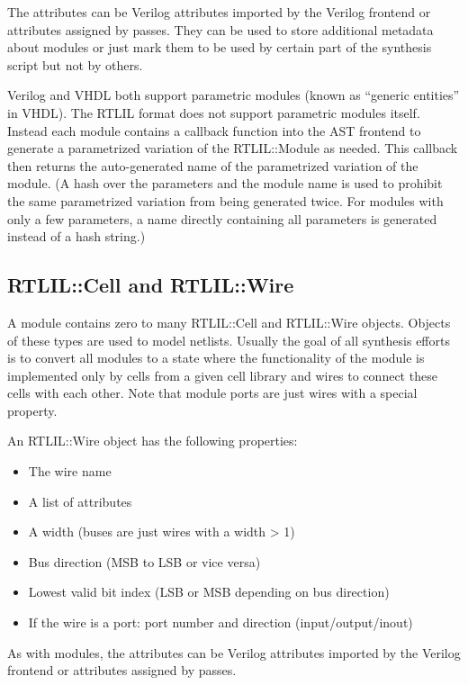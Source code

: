 The attributes can be Verilog attributes imported by the Verilog frontend or attributes assigned
by passes. They can be used to store additional metadata about modules or just mark them to be
used by certain part of the synthesis script but not by others.

Verilog and VHDL both support parametric modules (known as ``generic entities'' in VHDL). The RTLIL
format does not support parametric modules itself. Instead each module contains a callback function
into the AST frontend to generate a parametrized variation of the RTLIL::Module as needed. This
callback then returns the auto-generated name of the parametrized variation of the module. (A hash
over the parameters and the module name is used to prohibit the same parametrized variation from being
generated twice. For modules with only a few parameters, a name directly containing all parameters
is generated instead of a hash string.)

\subsection{RTLIL::Cell and RTLIL::Wire}

A module contains zero to many RTLIL::Cell and RTLIL::Wire objects. Objects of
these types are used to model netlists. Usually the goal of all synthesis efforts is to convert
all modules to a state where the functionality of the module is implemented only by cells
from a given cell library and wires to connect these cells with each other. Note that module
ports are just wires with a special property.

An RTLIL::Wire object has the following properties:

\begin{itemize}
\item The wire name
\item A list of attributes
\item A width (buses are just wires with a width > 1)
\item Bus direction (MSB to LSB or vice versa)
\item Lowest valid bit index (LSB or MSB depending on bus direction)
\item If the wire is a port: port number and direction (input/output/inout)
\end{itemize}

As with modules, the attributes can be Verilog attributes imported by the
Verilog frontend or attributes assigned by passes.

